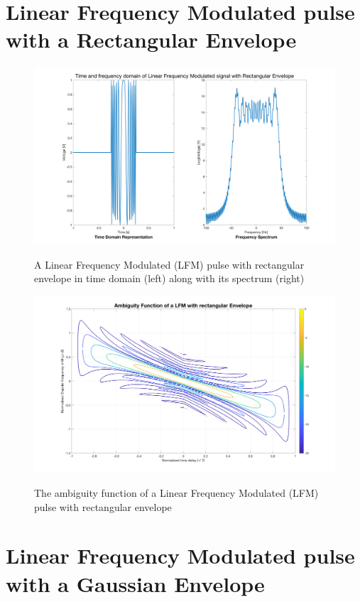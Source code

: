 \newpage
\section*{ Linear Frequency Modulated pulse with a Rectangular Envelope }

\begin{figure}[H]
\centering
{\includegraphics[scale=0.18]{usp8_2.png}}
\caption{ A Linear Frequency Modulated (LFM) pulse with rectangular envelope in time domain (left) along with its spectrum (right)}
\end{figure}

\begin{figure}[H]
\centering
{\includegraphics[scale=0.18]{usp8_5.png}}
\caption{ The ambiguity function of a Linear Frequency Modulated (LFM) pulse with rectangular envelope }
\end{figure}

\newpage

\section*{Linear Frequency Modulated pulse with a Gaussian Envelope } 

